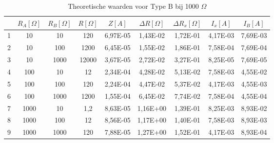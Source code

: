 \begin{table}[H]
    \centering
    \label{tab:TB1OO0}
    \caption{Theoretische waarden voor Type B bij 1000 $\Omega$}
    \begin{tabular}{| c | c | c | c | c | c | c | c | c |}
        \hline
                & $R_A [\Omega]$    & $R_B [\Omega]$    & $R [\Omega]$  & $Z [A]$   & $\Delta R [\Omega]$   & $\Delta R_x [\Omega]$ & $I_x [A]$                 & $I_B [A]$             \\ \hline
                1	&10	&10	&120	&6,97E-05	&1,43E-02	&1,72E-01	&4,17E-03	&7,69E-03 \\ \hline
                2	&10	&100	&1200	&6,45E-05	&1,55E-02	&1,86E-01	&7,58E-04	&7,69E-04\\ \hline
                3	&10	&1000	&12000	&3,67E-05	&2,72E-02	&3,27E-01	&8,25E-05	&7,69E-05\\ \hline
                4	&100	&10	&12	&2,34E-04	&4,28E-02	&5,13E-02	&7,58E-03	&4,55E-02\\ \hline
                5	&100	&100	&120	&2,24E-04	&4,47E-02	&5,37E-02	&4,17E-03	&4,55E-03\\ \hline
                6	&100	&1000	&1200	&1,55E-04	&6,45E-02	&7,74E-02	&7,58E-04	&4,55E-04\\ \hline
                7	&1000	&10	&1,2	&8,63E-05	&1,16E+00	&1,39E-01	&8,25E-03	&8,93E-02\\ \hline
                8	&1000	&100	&12	&8,56E-05	&1,17E+00	&1,40E-01	&7,58E-03	&8,93E-03\\ \hline
                9	&1000	&1000	&120	&7,88E-05	&1,27E+00	&1,52E-01	&4,17E-03	&8,93E-04  \\ \hline
    \end{tabular}
\end{table}